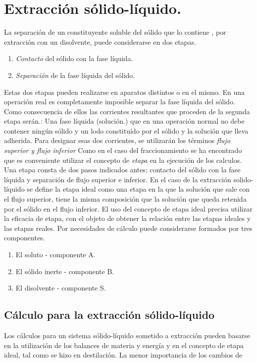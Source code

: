 \documentclass[12pt,openany]{book}
\begin{document}
\chapter{Extracción sólido-líquido.}
La separación de un constituyente soluble del sólido que lo contiene 
, por extracción con un disolvente, puede considerarse en dos etapas.
\begin{enumerate}
    \item \textit{Contacto} del sólido con la fase líquida.
    \item \textit{Separación} de la fase líquida del sólido.
\end{enumerate}
Estas dos etapas pueden realizarse en aparatos distintos o en el mismo.
En una operación real es completamente imposible separar la fase líquida del sólido.
Como consecuencia de ellos las corrientes resultantes que proceden de la segunda etapa serán.:
Una fase líquida (solución.) que en una operación normal no debe contener ningún sólido y un lodo constituído por el sólido y 
la solución que lleva adherida. Para designar esas dos corrientes, se utilizarán los términos \textit{flujo superior y flujo inferior}
Como en el caso del fraccionamiento se ha encontrado que es conveniente utilizar el concepto de \textit{etapa} en la ejecución de los calculos.
Una etapa consta de dos pasos indicados antes: contacto del sólido con la fase líquida y separación de flujo superior e inferior.
En el caso de la extracción solido-líquido se define la etapa ideal como una etapa en la que la solución que sale con el flujo superior, tiene la misma
composición que la solución que queda retenida por el sólido en el flujo inferior.
El uso del concepto de etapa ideal precisa utilizar la eficacia de etapa, con el objeto de obtener la relación entre las etapas ideales y las etapas reales.
Por necesidades de cálculo puede considerarse formados por tres componentes.
\begin{enumerate}
\item El soluto - componente A.
\item El sólido inerte - componente B.
\item El disolvente - componente S.
\end{enumerate}

\section{Cálculo para la extracción sólido-líquido}
Los cálculos para un sistema sólido-líquido sometido a extracción pueden basarse en la
utilización de los balances de materia y energía y en el concepto
de etapa ideal, tal como se hizo en destilación. La menor importancia de los cambios de 
\end{document}

